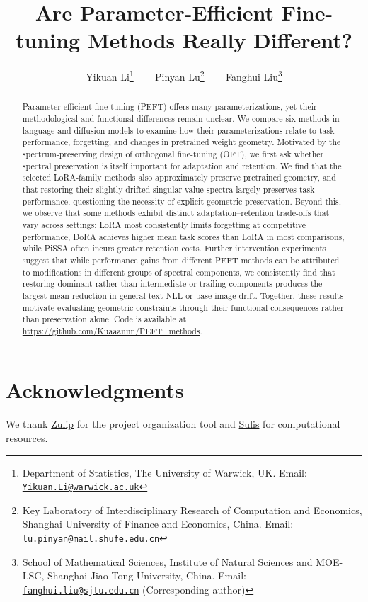 \documentclass{article}
\title{Are Parameter-Efficient Fine-tuning Methods Really Different?}
\author{%
  Yikuan Li\thanks{Department of Statistics, The University of Warwick, UK. Email: \href{mailto:Yikuan.Li@warwick.ac.uk}{\texttt{Yikuan.Li@warwick.ac.uk}}}
  ~~~
  Pinyan Lu\thanks{Key Laboratory of Interdisciplinary Research of Computation and Economics, Shanghai University of Finance and Economics, China. Email: \href{mailto:lu.pinyan@mail.shufe.edu.cn}{\texttt{lu.pinyan@mail.shufe.edu.cn}}}
  ~~~
  Fanghui Liu\thanks{School of Mathematical Sciences, Institute of Natural Sciences and MOE-LSC, Shanghai Jiao Tong University, China. Email: \href{mailto:fanghui.liu@sjtu.edu.cn}{\texttt{fanghui.liu@sjtu.edu.cn}} (Corresponding author)} 
}
\date{}
\theoremstyle{definition}
\begin{document}
\renewcommand{\floatpagefraction}{.85}
\maketitle
\begin{abstract}
Parameter-efficient fine-tuning (PEFT) offers many parameterizations, yet their methodological and functional differences remain unclear. We compare six methods in language and diffusion models to examine how their parameterizations relate to task performance, forgetting, and changes in pretrained weight geometry. Motivated by the spectrum-preserving design of orthogonal fine-tuning (OFT), we first ask whether spectral preservation is itself important for adaptation and retention. We find that the selected LoRA-family methods also approximately preserve pretrained geometry, and that restoring their slightly drifted singular-value spectra largely preserves task performance, questioning the necessity of explicit geometric preservation. Beyond this, we observe that some methods exhibit distinct adaptation--retention trade-offs that vary across settings: LoRA most consistently limits forgetting at competitive performance, DoRA achieves higher mean task scores than LoRA in most comparisons, while PiSSA often incurs greater retention costs. Further intervention experiments suggest that while performance gains from different PEFT methods can be attributed to modifications in different groups of spectral components, we consistently find that restoring dominant rather than intermediate or trailing components produces the largest mean reduction in general-text NLL or base-image drift. Together, these results motivate evaluating geometric constraints through their functional consequences rather than preservation alone.
Code is available at \url{https://github.com/Kuaaannn/PEFT_methods}.
\end{abstract}



\FloatBarrier





\label{paper:mainend}
\section*{Acknowledgments}
We thank \href{https://zulip.com/}{Zulip} for the project organization tool and \href{https://warwick.ac.uk/research/rtp/sc/sulis/}{Sulis} for computational resources.



\clearpage

\clearpage
\appendix
{}

\FloatBarrier

\FloatBarrier

\FloatBarrier

\clearpage

\clearpage

\FloatBarrier
\end{document}

